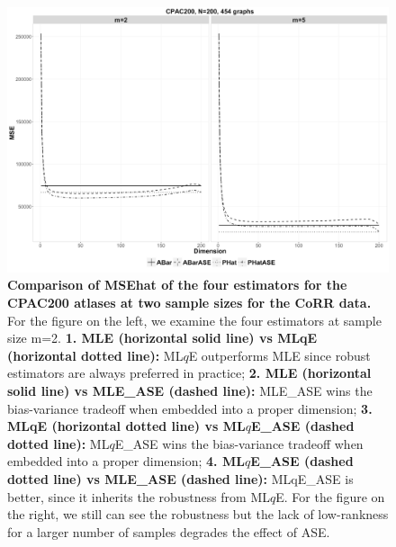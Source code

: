 \documentclass[simplex.tex]{subfiles}
\begin{document}
\begin{figure}[h!]
\begin{cframed}
\centering
\includegraphics[width=\textwidth]{./figs/robDim.png}
\caption{
{\bf Comparison of MSEhat of the four estimators for the CPAC200 atlases at two sample sizes for the CoRR data.}  
For the figure on the left, we examine the four estimators at sample size m=2. 
{\bf 1. MLE (horizontal solid line) vs MLqE (horizontal dotted
line):} 
ML$q$E outperforms MLE since
robust estimators are always preferred in practice;
{\bf 2. MLE (horizontal solid line) vs MLE\_ASE (dashed line):} MLE\_ASE wins the bias-variance
tradeoff when embedded into a proper dimension; 
{\bf 3. MLqE (horizontal
dotted line) vs ML$q$E\_ASE (dashed dotted line):}
ML$q$E\_ASE wins the
bias-variance tradeoff when embedded into a proper dimension; 
{\bf 4.  ML$q$E\_ASE (dashed dotted line) vs MLE\_ASE (dashed
line):}
MLqE\_ASE is better, since it inherits the robustness from 
ML$q$E. For the figure on the right, we still can see the
robustness but the lack of low-rankness
for a larger number of samples degrades the effect of ASE.
}
\label{fig:robDim}
\end{cframed}
\end{figure}
\end{document}
